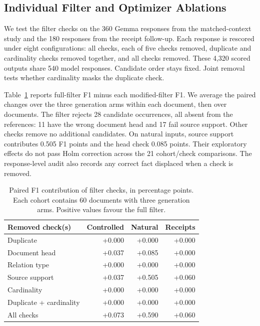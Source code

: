 \subsection{Individual Filter and Optimizer Ablations}
\label{sec:eval:individual_ablation}

We test the filter checks on the 360 Gemma responses from the matched-context study and the 180 responses from the receipt follow-up. Each response is rescored under eight configurations: all checks, each of five checks removed, duplicate and cardinality checks removed together, and all checks removed. These 4,320 scored outputs share 540 model responses. Candidate order stays fixed. Joint removal tests whether cardinality masks the duplicate check.

Table~\ref{tab:gate_checks} reports full-filter F1 minus each modified-filter F1. We average the paired changes over the three generation arms within each document, then over documents. The filter rejects 28 candidate occurrences, all absent from the references: 11 have the wrong document head and 17 fail source support. Other checks remove no additional candidates. On natural inputs, source support contributes 0.505 F1 points and the head check 0.085 points. Their exploratory effects do not pass Holm correction across the 21 cohort/check comparisons. The response-level audit also records any correct fact displaced when a check is removed.

\begin{table}[t]
\centering
\caption{Paired F1 contribution of filter checks, in percentage points. Each cohort contains 60 documents with three generation arms. Positive values favour the full filter.}
\label{tab:gate_checks}
\small
\begin{tabular}{lrrr}
\toprule
Removed check(s) & Controlled & Natural & Receipts \\
\midrule
Duplicate & +0.000 & +0.000 & +0.000 \\
Document head & +0.037 & +0.085 & +0.000 \\
Relation type & +0.000 & +0.000 & +0.000 \\
Source support & +0.037 & +0.505 & +0.060 \\
Cardinality & +0.000 & +0.000 & +0.000 \\
Duplicate + cardinality & +0.000 & +0.000 & +0.000 \\
All checks & +0.073 & +0.590 & +0.060 \\
\bottomrule
\end{tabular}
\end{table}


